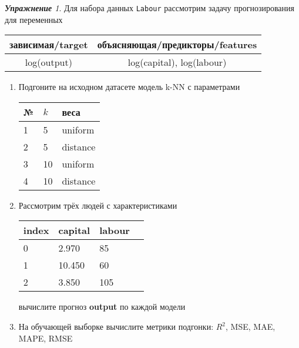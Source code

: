 \documentclass[a4,12pt]{article}
\theoremstyle{remark}
\newtheorem{exercise}{\textbf{Упражнение}}[section]
\begin{document}
\begin{exercise}
Для набора данных \texttt{Labour} рассмотрим задачу прогнозирования
для переменных
\begin{center}
	\begin{tabular}{|c|c|}\hline
		зависимая/target & объясняющая/предикторы/features \\ \hline
		log(output) & log(capital), log(labour) \\ \hline
	\end{tabular}
\end{center}
\begin{enumerate}
	\item Подгоните на исходном датасете модель k-NN с параметрами
	\begin{center}
		\begin{tabular}{|l|l|l|}\hline
		№ & \(k\) & веса \\ \hline
		1 & 5 & uniform \\
		2 & 5 & distance \\
		3 & 10 & uniform \\
		4 & 10 & distance \\ \hline
		\end{tabular}
	\end{center}
	\item Рассмотрим трёх людей с характеристиками
	\begin{center}
		\begin{tabular}{|l||l||l|l|}\hline
			index & capital & labour \\ \hline\hline
			0 & 2.970 & 85 \\
			1 & 10.450 & 60  \\
			2 & 3.850 & 105 \\ \hline
		\end{tabular}
	\end{center}
	вычислите прогноз \textbf{output} по каждой модели

	\item На обучающей выборке вычислите метрики подгонки: \(R^2\), 
	MSE, MAE, MAPE, RMSE
\end{enumerate}
\end{exercise}
\end{document}

